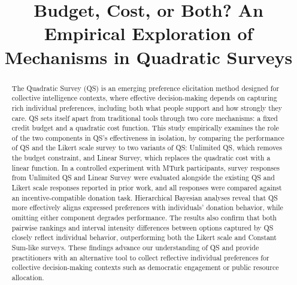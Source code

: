 \documentclass[sigconf]{acmart}
\begin{document}

\title[Empirical Exploration of Quadratic Survey Mechanisms]{Budget, Cost, or Both? An Empirical Exploration of Mechanisms in Quadratic Surveys}








\renewcommand{\shortauthors}{Ti-Chung Cheng et al.}

\begin{abstract}
    The Quadratic Survey (QS) is an emerging preference elicitation method designed for collective intelligence contexts, where effective decision-making depends on capturing rich individual preferences, including both what people support and how strongly they care. QS sets itself apart from traditional tools through two core mechanisms: a fixed credit budget and a quadratic cost function. This study empirically examines the role of the two components in QS's effectiveness in isolation, by comparing the performance of QS and the Likert scale survey to two variants of QS: Unlimited QS, which removes the budget constraint, and Linear Survey, which replaces the quadratic cost with a linear function. In a controlled experiment with MTurk participants, survey responses from Unlimited QS and Linear Survey were evaluated alongside the existing QS and Likert scale responses reported in prior work, and all responses were compared against an incentive-compatible donation task. Hierarchical Bayesian analyses reveal that QS more effectively aligns expressed preferences with individuals' donation behavior, while omitting either component degrades performance. The results also confirm that both pairwise rankings and interval intensity differences between options captured by QS closely reflect individual behavior, outperforming both the Likert scale and Constant Sum-like surveys. These findings advance our understanding of QS and provide practitioners with an alternative tool to collect reflective individual preferences for collective decision-making contexts such as democratic engagement or public resource allocation.
\end{abstract}
\end{document}
